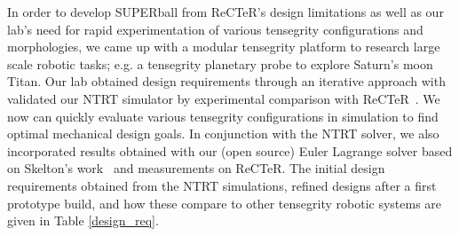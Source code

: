 In  order  to  develop  SUPERball  from  ReCTeR's  design
limitations as well as our lab’s need for rapid experimentation
of  various  tensegrity  configurations  and  morphologies,  we
came  up  with  a  modular  tensegrity  platform  to  research
large  scale  robotic  tasks;  e.g.  a  tensegrity  planetary  probe
to explore Saturn's moon Titan.
Our lab obtained design requirements through an iterative approach with validated our NTRT simulator by experimental comparison with ReCTeR~\cite{Caluwaerts2013rsif}.
We now can quickly  evaluate  various
tensegrity  configurations  in  simulation  to  find  optimal  mechanical  design  goals.  In conjunction with the  NTRT  solver,  we  also
incorporated  results  obtained  with  our  (open  source)  Euler
Lagrange solver based on Skelton's work~\cite{Skelton2009} and measurements on ReCTeR.
The initial design requirements obtained from the NTRT simulations, refined designs after a first prototype build, and how these compare to other tensegrity robotic systems are given in Table \ref{design_req}.


